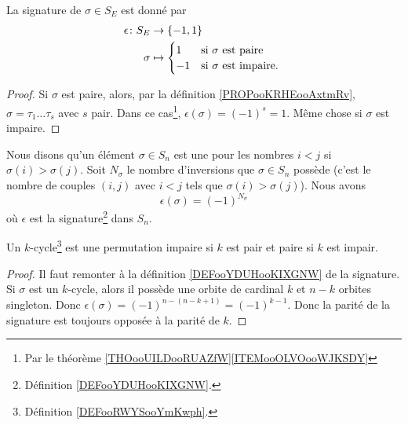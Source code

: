 \begin{proposition}       \label{PROPooXIQOooCcoekP}
	La signature de \( \sigma\in S_E\) est donné par
	\begin{equation}
		\begin{aligned}
			\epsilon\colon S_E & \to \{ -1,1 \}                                   \\
			\sigma             & \mapsto \begin{cases}
				                             1  & \text{si \( \sigma\) est paire }    \\
				                             -1 & \text{si \( \sigma\) est impaire. }
			                             \end{cases}
		\end{aligned}
	\end{equation}
\end{proposition}

\begin{proof}
	Si \( \sigma\) est paire, alors, par la définition \ref{PROPooKRHEooAxtmRv}, \( \sigma=\tau_1\ldots\tau_s\) avec \( s\) pair. Dans ce cas\footnote{Par le théorème \ref{THOooUILDooRUAZfW}\ref{ITEMooOLVOooWJKSDY}}, \( \epsilon(\sigma)=(-1)^s=1\). Même chose si \( \sigma\) est impaire.
\end{proof}

\begin{lemma}  \label{LEMooWGRXooHWyzLC}
	Nous disons qu'un élément \( \sigma \in S_n\) est une  pour les nombres \( i<j\) si \( \sigma(i)>\sigma(j)\). Soit \( N_\sigma\) le nombre d'inversions que \( \sigma\in S_n\) possède (c'est le nombre de couples \( (i,j)\) avec \( i<j\) tels que \( \sigma(i)>\sigma(j)\)). Nous avons
	\begin{equation}
		\epsilon(\sigma)=(-1)^{N_\sigma}
	\end{equation}
	où \( \epsilon\) est la signature\footnote{Définition \ref{DEFooYDUHooKIXGNW}.} dans \( S_n\).
\end{lemma}

\begin{lemma}       \label{LemhxnkMf}
	Un \( k\)-cycle\footnote{Définition \ref{DEFooRWYSooYmKwph}.} est une permutation impaire si \( k\) est pair et paire si \( k\) est impair.
\end{lemma}

\begin{proof}
	Il faut remonter à la définition \ref{DEFooYDUHooKIXGNW} de la signature. Si \( \sigma\) est un \( k\)-cycle, alors il possède une orbite de cardinal \( k\) et \( n-k\) orbites singleton. Donc \( \epsilon(\sigma)=(-1)^{n-(n-k+1)}=(-1)^{k-1}\). Donc la parité de la signature est toujours opposée à la parité de \( k\).
\end{proof}

